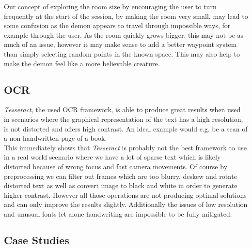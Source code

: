 Our concept of exploring the room size by encouraging the user to turn frequently at the start of the session, by making the room very small, may lead to some confusion as the demon appears to travel through impossible ways, for example through the user.
As the room quickly grows bigger, this may not be as much of an issue, however it may make sense to add a better waypoint system than simply selecting random points in the known space.
This may also help to make the demon feel like a more believable creature.

\subsection{OCR}
\emph{Tesseract}, the used OCR framework, is able to produce great results when used in scenarios where the graphical representation of the text has a high resolution, is not distorted and offers high contrast.
An ideal example would e.g. be a scan of a non-handwritten page of a book. \\
This immediately shows that \emph{Tesseract} is probably not the best framework to use in a real world scenario where we have a lot of sparse text which is likely distorted because of wrong focus and fast camera movements. 
Of course by preprocessing we can filter out frames which are too blurry, deskew and rotate distorted text as well as convert image to black and white in order to generate higher contrast. 
However all those operations are not producing optimal solutions and can only improve the results slightly. 
Additionally the issues of low resolution and unusual fonts let alone handwriting are impossible to be fully mitigated. 

\subsection{Case Studies}

